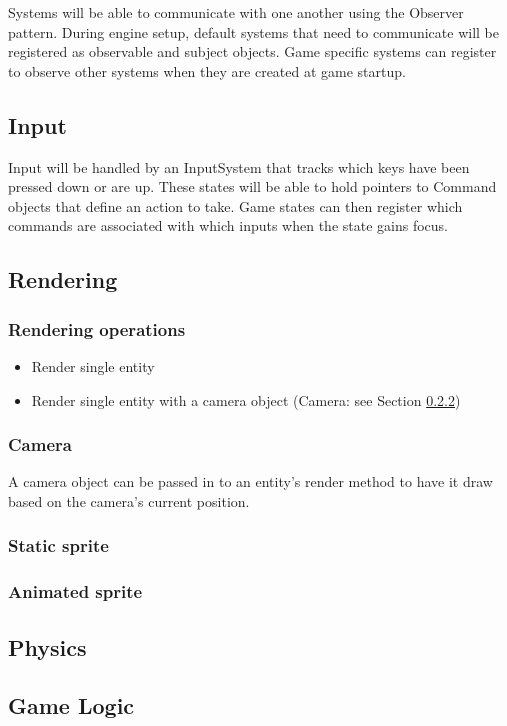 \documentclass[12pt]{article}
\begin{document}
Systems will be able to communicate with one another using the Observer pattern.  During engine setup, default systems that need to communicate will be registered as observable and subject objects.  Game specific systems can register to observe other systems when they are created at game startup.

\subsection{	Input }
Input will be handled by an InputSystem that tracks which keys have been pressed down or are up.  These states will be able to hold pointers to Command objects that define an action to take.  Game states can then register which commands are associated with which inputs when the state gains focus.
 

\subsection{	Rendering }
\subsubsection{Rendering operations }
	\begin{itemize}
		\item Render single entity
		\item Render single entity with a camera object (Camera: see Section \ref{sec:Camera})
	\end{itemize}

\subsubsection{ Camera} \label{sec:Camera}
A camera object can be passed in to an entity's render method to have it draw based on the camera's current position.

\subsubsection{Static sprite }
\subsubsection{Animated sprite }
\subsection{	Physics}
\subsection{	Game Logic}
\end{document}

